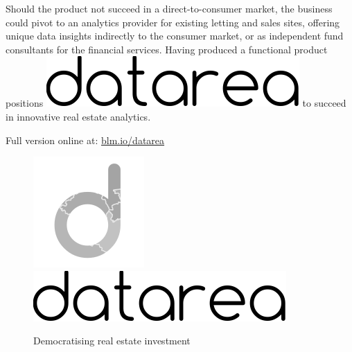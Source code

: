 \documentclass[
10pt, %
a4paper, %
oneside, %
headinclude,footinclude, %
BCOR5mm, %
]{scrartcl}
\newcommand*{\logo}{\includegraphics[scale=.22]{Figures/datarea.pdf}}
\begin{document}
Should the product not succeed in a direct-to-consumer market, the
business could pivot to an analytics provider for existing letting and
sales sites, offering unique data insights indirectly to the consumer
market, or as independent fund consultants for the financial
services. Having produced a functional product positions \logo \hspace{.1em} to
succeed in innovative real estate analytics.

\begin{flushright}
{\small Full version online at: \href{http://blm.io/datarea}{blm.io/datarea}}
\end{flushright}

\begin{figure}[h!]
\begin{center}
\includegraphics[width=.1\textwidth]{Figures/logo.png} \\
\includegraphics[scale=.4]{Figures/datarea.pdf} \\
\caption*{ {\sf Democratising real estate investment}}
\end{center}
\end{figure}
\end{document}
